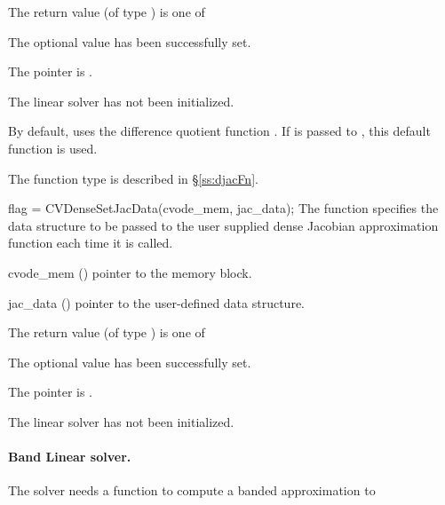 {
  The return value  (of type ) is one of
  \begin{args}
  \item[\Id{CVDENSE\_SUCCESS}] 
    The optional value has been successfully set.
  \item[\Id{CVDENSE\_MEM\_NULL}]
    The  pointer is .
  \item[\Id{CVDENSE\_LMEM\_NULL}]
    The {\cvdense} linear solver has not been initialized.
  \end{args}
}
{
  By default, {\cvdense} uses the difference quotient function .
  If  is passed to , this default function is used.

  The function type  is described in \S\ref{ss:djacFn}.
}
{
  flag = CVDenseSetJacData(cvode\_mem, jac\_data);
}
{
  The function  specifies the data structure
  to be passed to the user supplied dense Jacobian approximation 
  function each time it is called.
}
{
  \begin{args}
  \item[cvode\_mem] ()
    pointer to the {\cvode} memory block.
  \item[jac\_data] ()
    pointer to the user-defined data structure.
  \end{args}
}
{
  The return value  (of type ) is one of
  \begin{args}
  \item[\Id{CVDENSE\_SUCCESS}] 
    The optional value has been successfully set.
  \item[\Id{CVDENSE\_MEM\_NULL}]
    The  pointer is .
  \item[\Id{CVDENSE\_LMEM\_NULL}]
    The {\cvdense} linear solver has not been initialized.
  \end{args}
}
{}
\noindent\paragraph{\bf Band Linear solver.}
The 
{\cvdense} solver needs a function to compute a banded approximation to
